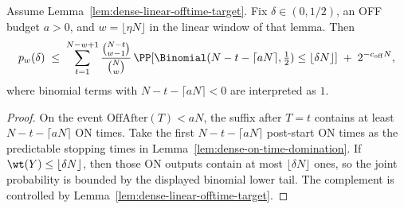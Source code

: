 \begin{corollary}
\label{cor:dense-first-start-offbudget-target}
Assume Lemma~\ref{lem:dense-linear-offtime-target}. Fix \(\delta\in(0,1/2)\), an OFF budget \(a>0\), and
\(w=\lfloor\eta N\rfloor\) in the linear window of that lemma. Then
\[
p_w(\delta)
\;\le\;
\sum_{t=1}^{N-w+1}
\frac{\binom{N-t}{w-1}}{\binom{N}{w}}\,
\PP[\Binomial(N-t-\lceil aN\rceil,\tfrac12)\le \lfloor\delta N\rfloor]
\;+\;
2^{-c_{\mathrm{off}}N},
\]
where binomial terms with \(N-t-\lceil aN\rceil<0\) are interpreted as \(1\).
\end{corollary}

\begin{proof}
On the event \(\mathrm{OffAfter}(T)<aN\), the suffix after \(T=t\) contains at least \(N-t-\lceil aN\rceil\) ON times. Take
the first \(N-t-\lceil aN\rceil\) post-start ON times as the predictable stopping times in
Lemma~\ref{lem:dense-on-time-domination}. If \(\wt(Y)\le \lfloor\delta N\rfloor\), then those ON outputs contain at
most \(\lfloor\delta N\rfloor\) ones, so the joint probability is bounded by the displayed binomial lower tail. The
complement is controlled by Lemma~\ref{lem:dense-linear-offtime-target}.
\end{proof}
